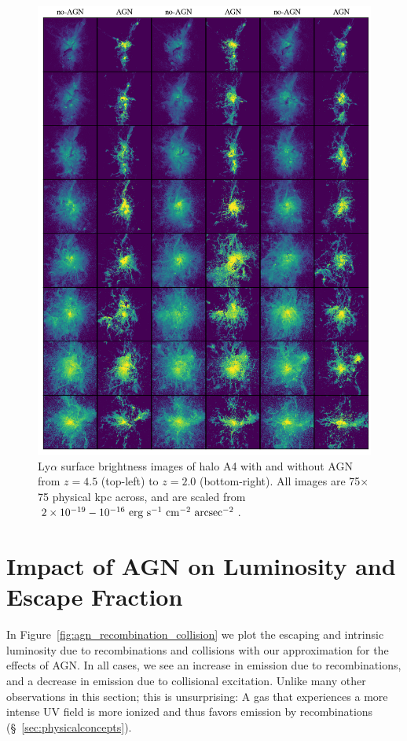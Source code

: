 \begin{figure}
    \centering
    \includegraphics[width=\textwidth,keepaspectratio]{figures/agn_rogues_A4.png}
    \caption{
        Ly$\alpha$ surface brightness images of halo A4 with and without AGN from $z=4.5$ (top-left) to $z=2.0$ (bottom-right).
        All images are 75$\times$75 physical kpc across, and are scaled from $2\times10^{-19}-10^{-16}\ \rm{erg}\ \rm{s}^{-1}\ \rm{cm}^{-2}\ \rm{arcsec}^{-2}$.
    }
  \label{fig:agn_rogues4}
\end{figure}


\section{Impact of AGN on Luminosity and Escape Fraction}
\label{sec:agn_blob_luminosity}
In Figure~\ref{fig:agn_recombination_collision} we plot the escaping and intrinsic luminosity due to recombinations and collisions with our approximation for the effects of AGN.
In all cases, we see an increase in emission due to recombinations, and a decrease in emission due to collisional excitation.
Unlike many other observations in this section; this is unsurprising: A gas that experiences a more intense UV field is more ionized and thus favors emission by recombinations (\S~\ref{sec:physicalconcepts}).

